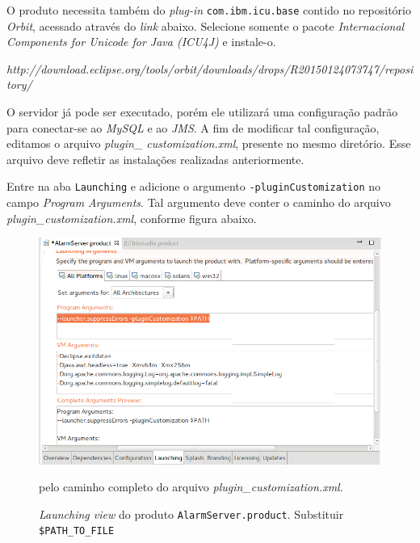\begin{enumerate}[i.]
O produto necessita também do \textit{plug-in} \texttt{com.ibm.icu.base} contido
no repositório \textit{Orbit}, acessado através do \textit{link} abaixo.
Selecione somente o pacote \textit{Internacional Components for Unicode for
Java (ICU4J)} e instale-o.

\begin{center}
\textit{http://download.eclipse.org/tools/orbit/downloads/drops/R20150124073747/repository/}
\end{center}

O servidor já pode ser executado, porém ele utilizará uma configuração padrão
para conectar-se ao \textit{MySQL} e ao \textit{JMS}. A fim de modificar tal
configuração, editamos o arquivo \textit{plugin\_ customization.xml}, presente
no mesmo diretório. Esse arquivo deve refletir as instalações realizadas
anteriormente. 

\vspace{12pt}

Entre na aba \texttt{Launching} e adicione o argumento
\texttt{-pluginCustomization} no campo \textit{Program Arguments}. Tal argumento
deve conter o caminho do arquivo \textit{plugin\_customization.xml}, conforme
figura abaixo.

\FloatBarrier

\begin{figure}[h]

\centering
\includegraphics[scale=0.45]{image/launch-view}
\caption {\textit{Launching view} do produto \texttt{AlarmServer.product}.
Substituir \texttt{\$PATH\_TO\_FILE}} pelo caminho completo do arquivo
\textit{plugin\_customization.xml}.
\label{img:launch-view} 
\end{figure}


\end{enumerate}

